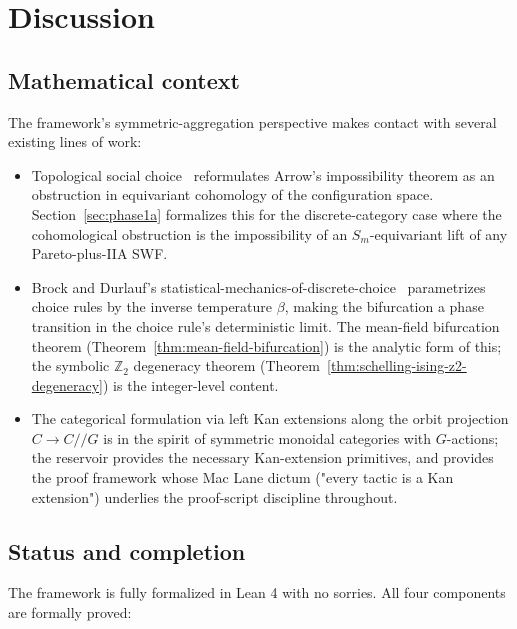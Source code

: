\documentclass[11pt,a4paper]{article}
\theoremstyle{plain}
\theoremstyle{definition}
\theoremstyle{remark}
\newcommand{\Sm}{S_{m}}
\newcommand{\Ztwo}{\mathbb{Z}_{2}}
\newcommand{\fpath}[1]{\texttt{\detokenize{#1}}}
\newcommand{\sslash}{\mathbin{/\!\!/}}
\begin{document}
\section{Discussion}
\label{sec:discussion}

\subsection{Mathematical context}

The framework's symmetric-aggregation perspective makes contact with
several existing lines of work:

\begin{itemize}
  \item Topological social choice~\cite{chichilnisky-1980}
        reformulates Arrow's impossibility theorem as an obstruction
        in equivariant cohomology of the configuration space.
        Section~\ref{sec:phase1a} formalizes this for the
        discrete-category case where the cohomological obstruction
        is the impossibility of an $\Sm$-equivariant lift of any
        Pareto-plus-IIA SWF.
  \item Brock and Durlauf's
        statistical-mechanics-of-discrete-choice~\cite{brock-durlauf-2001}
        parametrizes choice rules by the inverse temperature
        $\beta$, making the bifurcation a phase transition in the
        choice rule's deterministic limit.  The mean-field
        bifurcation theorem
        (Theorem~\ref{thm:mean-field-bifurcation}) is the analytic
        form of this; the symbolic $\Ztwo$ degeneracy theorem
        (Theorem~\ref{thm:schelling-ising-z2-degeneracy}) is the
        integer-level content.
  \item The categorical formulation via left Kan extensions along
        the orbit projection $C \to C \sslash G$ is in the spirit
        of symmetric monoidal categories with $G$-actions; the
        \fpath{comp-cat-theory} reservoir provides the necessary
        Kan-extension primitives, and \fpath{kan-tactics} provides
        the proof framework whose Mac Lane dictum
        ("every tactic is a Kan extension") underlies the
        proof-script discipline throughout.
\end{itemize}

\subsection{Status and completion}

The framework is fully formalized in Lean 4 with no sorries.  All
four components are formally proved:
\end{document}
